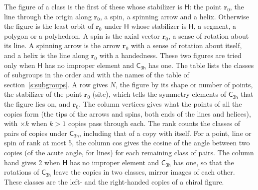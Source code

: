 \documentclass[10pt,a4paper]{article}
\numberwithin{equation}{section}
\newcommand{\grp}[1]{\mathsf{#1}}
\newcommand{\pointr}{\mathbf{r}}
\begin{document}
\leavevmode\label{n:head.figure}The figure of a class is the first of these whose stabilizer is $\grp{H}$: the point $\pointr_0$, the line through the origin along $\pointr_0$, a spin, a spinning arrow and a helix. Otherwise the figure is the least orbit of $\pointr_0$ under $\grp{H}$ whose stabilizer is $\grp{H}$, a segment, a polygon or a polyhedron. A spin is the axial vector $\pointr_0$, a sense of rotation about its line. A spinning arrow is the arrow $\pointr_0$ with a sense of rotation about itself, and a helix is the line along $\pointr_0$ with a handedness. These two figures are tried only when $\grp{H}$ has no improper element and $\grp{C_{3h}}$ has one. The table lists the classes of subgroups in the order and with the names of the table of section~\ref{s:subgroups}. \label{n:head.site}A row gives $N$, the figure by its shape or number of points, the stabilizer of the point $\pointr_0$ (site), which tells the symmetry elements of $\grp{C_{3h}}$ that the figure lies on, and $\pointr_0$. \label{n:head.vertices}The column vertices gives what the points of all the copies form (the tips of the arrows and spins, both ends of the lines and helices), with ${\times}k$ when $k > 1$ copies pass through each. \label{n:head.rank}The rank counts the classes of pairs of copies under $\grp{C_{3h}}$, including that of a copy with itself. \label{n:head.cos}For a point, line or spin of rank at most 5, the column cos gives the cosine of the angle between two copies (of the acute angle, for lines) for each remaining class of pairs. \label{n:head.hand}The column hand gives 2 when $\grp{H}$ has no improper element and $\grp{C_{3h}}$ has one, so that the rotations of $\grp{C_{3h}}$ leave the copies in two classes, mirror images of each other. These classes are the left- and the right-handed copies of a chiral figure.
\end{document}

